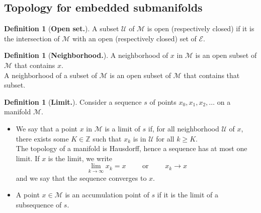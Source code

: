 \documentclass[12pt, openany]{report}
\newcommand{\Z}{\mathbb{Z}}
\newcommand{\M}{\mathcal{M}}
\newcommand{\E}{\mathcal{E}}
\theoremstyle{definition}
\newtheorem{definition}[thm]{Definition}
\begin{document}
\subsection{Topology for embedded submanifolds}
\begin{definition}[\textbf{Open set.}]
	A subset $\mathcal{U}$ of $\mathcal{M}$ is open (respectively closed) if it is the intersection of $\M$ with an open (respectively closed) set of $\E$.
\end{definition}
\begin{definition}[\textbf{Neighborhood.}]
	A neighborhood of $x$ in $\M$ is an open subset of $\M$ that contains $x$. \\
	A neighborhood of a subset of $\M$ is an open subset of $\M$ that contains that subset.
\end{definition}
\begin{definition}[\textbf{Limit.}]
	Consider a sequence $s$ of points $x_0,x_1,x_2,\dots$ on a manifold $\M$. 
	\begin{itemize}
		\item We say that a point $x$ in $\M$ is a limit of $s$ if, for all neighborhood $\mathcal{U}$ of $x$, there exists some $K\in \Z$ such that $x_k$ is in $\mathcal{U}$ for all $k\ge K$. \\
		The topology of a manifold is Hausdorff, hence a sequence has at most one limit. If $x$ is the limit, we write 
		\begin{equation}
			\lim_{k\to \infty} x_k = x \qquad \text{ or }\qquad x_k\to x
		\end{equation}
		and we say that the sequence converges to $x$.
		\item A point $x\in \M$ is an accumulation point of $s$ if it is the limit of a subsequence of $s$. 
	\end{itemize}
\end{definition}
\end{document}
